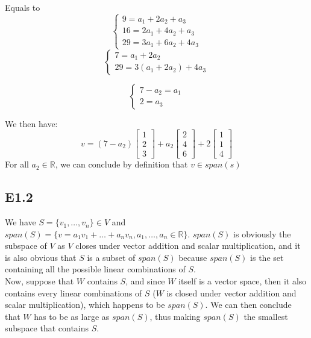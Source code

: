 \documentclass[12pt]{article}
\begin{document}
Equals to\\
\begin{equation*}
    \begin{cases}
              9= a_1+2a_2+a_3\\
              16= 2a_1+4a_2+a_3\\
         	  29= 3a_1+6a_2+4a_3
          \end{cases}
\end{equation*}
\begin{equation*}
    \begin{cases}
              7 = a_1+2a_2\\
     
         	  29= 3(a_1+2a_2)+4a_3
          \end{cases}
\end{equation*}

\begin{equation*}
    \begin{cases}
              7 -a_2 = a_1\\
     
         	  2= a_3
          \end{cases}
\end{equation*}

We then have: 
$$ v
= (7 -a_2)\begin{bmatrix}
1\\
2\\
3
\end{bmatrix} + a_2\begin{bmatrix}
2\\
4\\
6
\end{bmatrix} + 2\begin{bmatrix}
1\\
1\\
4
\end{bmatrix}$$ 
For all $a_2 \in \mathbb{R}$, we can conclude by definition that $v \in span(s)$

\subsection*{E1.2}
We have $S=\{v_1,\ldots,v_n\} \in V$ and $span(S) = \{v = a_1v_1+\ldots+a_nv_n, a_1,\ldots, a_n \in \mathbb{R}\}$. $span(S)$ is obviously the subspace of $V$ as $V$ closes under vector addition and scalar multiplication, and it is also obvious that $S$ is a subset of $span(S)$ because $span(S)$ is the set containing all the possible linear combinations of $S$. 	\\
Now, suppose that $W$ contains $S$, and since $W$ itself is a vector space, then it also contains every linear combinations of $S$ ($W$ is closed under vector addition and scalar multiplication), which happens to be $span(S)$. We can then conclude that $W$ has to be as large as $span(S)$, thus making $span(S)$ the smallest subspace that contains $S$.
\end{document}
